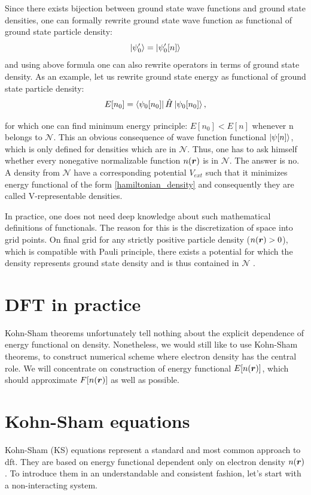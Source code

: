 \documentclass[openany, longbibliography,slovene,a4paper,12pt]{article}
\def\vec#1{\mbox{\boldmath$#1$}}
\begin{document}
Since there exists bijection between ground state wave functions and ground
state densities, one can formally rewrite ground state wave function as
functional of ground state particle density:
\begin{equation}
  \ket{\psi'_0} =  \ket{\psi'_0[n]}
  \end{equation}
and using above formula one can also rewrite operators in terms of ground state
density. As an example, let us rewrite ground state energy as functional of
ground state particle density:
\begin{equation} \label{hamiltonian_density}
  E[n_0] = \bra{\psi_0[n_0]}\hat H \ket{\psi_0[n_0]},
  \end{equation}

for which one can find minimum energy principle: $E[n_0]<E[n]$ whenever n
belongs to $\mathcal N$. This an obvious consequence of wave function functional
$\ket{\psi [n]}$, which is only defined for densities which are in $\mathcal N$.
Thus, one has to ask himself whether every nonegative normalizable function
$n(\vec r)$ is in $\mathcal N$.  The answer is no. A density from $\mathcal N$
have a corresponding potential $V_{ext}$ such that it minimizes energy functional
of the form \ref{hamiltonian_density} and consequently they are called V-representable densities. 

In practice, one does not need deep knowledge about such mathematical
definitions of functionals. The reason for this is the discretization of space
into grid points. On final grid for any strictly positive particle density
($n(\vec r) > 0$), which is compatible with Pauli principle, there exists a
potential for which the density represents ground state density and is thus contained in $\mathcal N$ \cite{advanced_course}.


  \section{DFT in practice}
Kohn-Sham theorems unfortunately tell nothing about the explicit dependence of
energy functional on density. Nonetheless, we would still like to use Kohn-Sham
theorems, to construct numerical scheme where electron density has the central
role. We will concentrate on  construction of energy functional $E[n(\vec r)]$,
which should approximate $F[n(\vec r)]$ as well as possible.
  
  \section{Kohn-Sham equations}
  Kohn-Sham (KS) equations represent a standard and most common approach to dft.
  They are based on energy functional dependent only on electron density $n(\vec
  r)$. To introduce them in an understandable and consistent fashion, let's start with a non-interacting system. 
 
\end{document}
